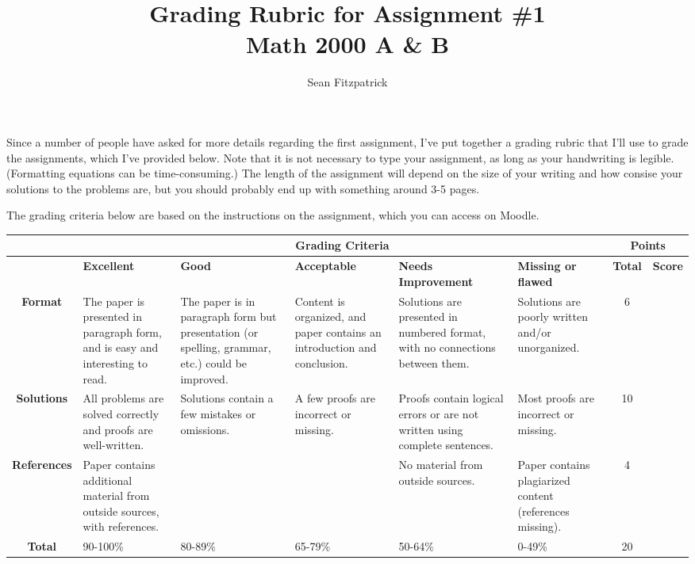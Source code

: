 \documentclass[letterpaper,12pt,landscape]{amsart}
\author{Sean Fitzpatrick}
\title{Grading Rubric for Assignment \#1\\Math 2000 A \& B}
\begin{document}
 \maketitle

Since a number of people have asked for more details regarding the first assignment, I've put together a grading rubric that I'll use to grade the assignments, which I've provided below. Note that it is not necessary to type your assignment, as long as your handwriting is legible. (Formatting equations can be time-consuming.) The length of the assignment will depend on the size of your writing and how consise your solutions to the problems are, but you should probably end up with something around 3-5 pages.

The grading criteria below are based on the instructions on the assignment, which you can access on Moodle.

\begin{center}
 \begin{tabularx}{\textwidth}{|c|X|X|X|X|X|c|c|}
\hline
   & \multicolumn{5}{c|}{{\bf Grading Criteria}} & \multicolumn{2}{c|}{{\bf Points}}\\
\hline
 & {\bf Excellent} & {\bf Good} & {\bf Acceptable} & {\bf Needs Improvement} & {\bf Missing or flawed} & {\bf Total} & {\bf Score}\\
\hline
{\bf Format} & The paper is presented in paragraph form, and is easy and interesting to read.& The paper is in paragraph form but presentation (or spelling, grammar, etc.) could be improved. & Content is organized, and paper contains an introduction and conclusion. & Solutions are presented in numbered format, with no connections between them. & Solutions are poorly written and/or unorganized. & 6 & \\
\hline
{\bf Solutions} & All problems are solved correctly and proofs are well-written. & Solutions contain a few mistakes or omissions. & A few proofs are incorrect or missing. & Proofs contain logical errors or are not written using complete sentences. & Most proofs are incorrect or missing.&10 & \\
\hline
{\bf References} & Paper contains additional material from outside sources, with references. &  &  & No material from outside sources. & Paper contains plagiarized content (references missing). & 4 & \\
\hline
{\bf Total} & 90-100\% & 80-89\% & 65-79\% & 50-64\% & 0-49\% & 20 &\\
\hline
 \end{tabularx}

\end{center}
\end{document}

